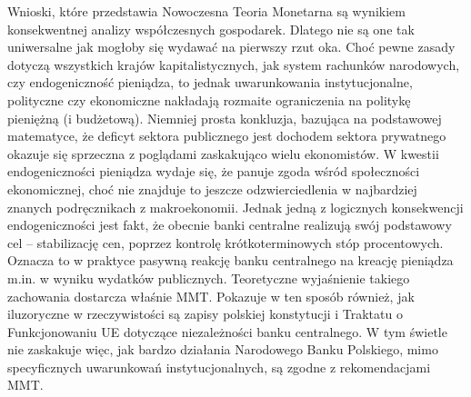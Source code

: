 \documentclass[
]{book}
\begin{document}
Wnioski, które przedstawia Nowoczesna Teoria Monetarna są wynikiem konsekwentnej analizy współczesnych gospodarek. Dlatego nie są one tak uniwersalne jak mogłoby się wydawać na pierwszy rzut oka. Choć pewne zasady dotyczą wszystkich krajów kapitalistycznych, jak system rachunków narodowych, czy endogeniczność pieniądza, to jednak uwarunkowania instytucjonalne, polityczne czy ekonomiczne nakładają rozmaite ograniczenia na politykę pieniężną (i budżetową). Niemniej prosta konkluzja, bazująca na podstawowej matematyce, że deficyt sektora publicznego jest dochodem sektora prywatnego okazuje się sprzeczna z poglądami zaskakująco wielu ekonomistów. W kwestii endogeniczności pieniądza wydaje się, że panuje zgoda wśród społeczności ekonomicznej, choć nie znajduje to jeszcze odzwierciedlenia w najbardziej znanych podręcznikach z makroekonomii. Jednak jedną z logicznych konsekwencji endogeniczności jest fakt, że obecnie banki centralne realizują swój podstawowy cel -- stabilizację cen, poprzez kontrolę krótkoterminowych stóp procentowych. Oznacza to w praktyce pasywną reakcję banku centralnego na kreację pieniądza m.in. w wyniku wydatków publicznych. Teoretyczne wyjaśnienie takiego zachowania dostarcza właśnie MMT. Pokazuje w ten sposób również, jak iluzoryczne w rzeczywistości są zapisy polskiej konstytucji i Traktatu o Funkcjonowaniu UE dotyczące niezależności banku centralnego. W tym świetle nie zaskakuje więc, jak bardzo działania Narodowego Banku Polskiego, mimo specyficznych uwarunkowań instytucjonalnych, są zgodne z rekomendacjami MMT.

  
\end{document}

